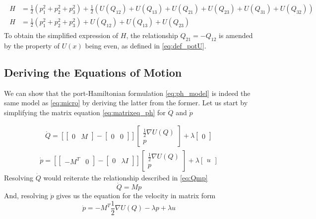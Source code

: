 \begin{gather*}
\begin{aligned}
    H &= \frac{1}{2}(p_1^2 + p_2^2 + p_3^2) + \frac{1}{2}(U(Q_{12}) + U(Q_{13}) + U(Q_{21}) + U(Q_{23}) + U(Q_{31}) +  U(Q_{32})) \\
    H &= \frac{1}{2}(p_1^2 + p_2^2 + p_3^2) + U(Q_{12}) + U(Q_{13}) + U(Q_{23})
\end{aligned}
\end{gather*}
To obtain the simplified expression of $H$, the relationship $Q_{21} = -Q_{12}$ is amended by the property of $U(x)$ being even, as defined in \autoref{eq:def_potU}.

\hrulefill

\subsection{Deriving the Equations of Motion}
We can show that the port-Hamiltonian formulation \autoref{eq:ph_model} is indeed the same model as \autoref{eq:micro} by deriving the latter from the former. 
Let us start by simplifying the matrix equation \autoref{eq:matrixeq_ph} for $\dot Q$ and $\dot p$

\begin{gather*}
    \dot Q = 
    \left[
    \begin{bmatrix}
        0 & M
    \end{bmatrix}
    - \begin{bmatrix}
        0 & 0
    \end{bmatrix}
    \right]
    \begin{bmatrix}
        \frac{1}{2}\nabla U(Q) \\
        p
    \end{bmatrix}
    +\lambda\begin{bmatrix}
        0
    \end{bmatrix}
\end{gather*}
\begin{gather*}
    \dot p= 
    \left[
    \begin{bmatrix}
        -M^T & 0
    \end{bmatrix}
    - \begin{bmatrix}
        0 & \lambda I
    \end{bmatrix}
    \right]
    \begin{bmatrix}
        \frac{1}{2}\nabla U(Q) \\
        p
    \end{bmatrix}
    +\lambda\begin{bmatrix}
        u
    \end{bmatrix}
\end{gather*}
Resolving $\dot Q$ would reiterate the relationship described in \autoref{eq:Qmp}
\begin{equation*}
    \dot Q = Mp
\end{equation*}
And, resolving $\dot p$ gives us the equation for the velocity in matrix form
\begin{equation*}
    \dot p = -M^T\frac{1}{2}\nabla U(Q) - \lambda p + \lambda u
\end{equation*}

